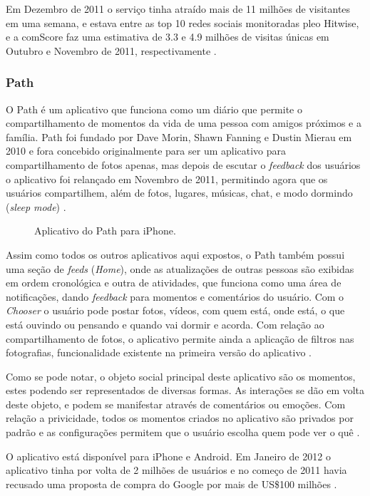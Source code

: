 \documentclass[diss]{template/setrem}
\begin{document}
Em Dezembro de 2011 o serviço tinha atraído mais de 11 milhões de visitantes em uma semana, e estava entre as top 10 redes sociais monitoradas pleo Hitwise, e a comScore faz uma estimativa de 3.3 e 4.9 milhões de visitas únicas em Outubro e Novembro de 2011, respectivamente \citep{Schonfeld2011}.

\subsubsection{Path}
O Path é um aplicativo que funciona como um diário que permite o compartilhamento de momentos da vida de uma pessoa com amigos próximos e a família. Path foi fundado por Dave Morin, Shawn Fanning e Dustin Mierau em 2010 e fora concebido originalmente para ser um aplicativo para compartilhamento de fotos apenas, mas depois de escutar o \emph{feedback} dos usuários o aplicativo foi relançado em Novembro de 2011, permitindo agora que os usuários compartilhem, além de fotos, lugares, músicas, chat, e modo dormindo (\emph{sleep mode}) \citep{CrunchBase2012e, Tsotsis2011a, Path2012}.

\begin{figure}[!h]
    \caption{Aplicativo do Path para iPhone.}
    \label{fig:path}
\end{figure}

Assim como todos os outros aplicativos aqui expostos, o Path também possui uma seção de \emph{feeds} (\emph{Home}), onde as atualizações de outras pessoas são exibidas em ordem cronológica e outra de atividades, que funciona como uma área de notificações, dando \emph{feedback} para momentos e comentários do usuário. Com o \emph{Chooser} o usuário pode postar fotos, vídeos, com quem está, onde está, o que está ouvindo ou pensando e quando vai dormir e acorda. Com relação ao compartilhamento de fotos, o aplicativo permite ainda a aplicação de filtros nas fotografias, funcionalidade existente na primeira versão do aplicativo \citep{Path2012}.

Como se pode notar, o objeto social principal deste aplicativo são os momentos, estes podendo ser representados de diversas formas. As interações se dão em volta deste objeto, e podem se manifestar através de comentários ou emoções. Com relação a privicidade, todos os momentos criados no aplicativo são privados por padrão e as configurações permitem que o usuário escolha quem pode ver o quê \citep{Path2012}.

O aplicativo está disponível para iPhone e Android. Em Janeiro de 2012 o aplicativo tinha por volta de 2 milhões de usuários e no começo de 2011 havia recusado uma proposta de compra do Google por mais de US\$100 milhões \citep{Path2012, CrunchBase2012e}.
\end{document}
